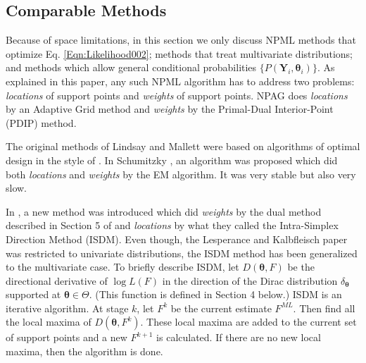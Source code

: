 

\subsection{Comparable Methods}

Because of space limitations, in this section we only discuss NPML methods that optimize Eq. \ref{Eqn:Likelihood002}; methods that treat multivariate distributions; and methods which allow general conditional probabilities 
$\{P(\bm{Y}_i, \bm{\theta}_i)\}$.
%
As explained in this paper, any such NPML algorithm has to address two problems: {\em locations} of support points and {\em weights} of support points.
%
NPAG does {\em locations} by an Adaptive Grid method and {\em weights} by the Primal-Dual Interior-Point (PDIP) method.
%

The original methods of Lindsay \cite{Lindsay1983}  and Mallett  
\cite{Mallet1986} 
were based on algorithms of optimal design in the style of \citet{Fedorov1972}. %
In Schumitzky
\cite{Schumitzky1991},
an algorithm  was proposed which did both {\em locations} and {\em weights} by the EM algorithm.  It was very stable but also very slow. 

In  \citet{Lesperance1992},  a new method was introduced  %
which did  {\em weights}  by the dual method described in Section 5 of  \citet{Lindsay1983} 
and {\em locations} by what they called the Intra-Simplex Direction Method (ISDM). Even though, the Lesperance and Kalbfleisch paper was restricted to univariate distributions, the ISDM method has been generalized to the multivariate case. To briefly describe ISDM, let  $D(\bm{\theta},F)$ be the directional derivative of   $\log L(F)$ in the direction of the Dirac distribution $\delta_{\bm{\theta}}$ supported at $\bm{\theta}  \in \Theta$.  (This function is defined in Section 4 below.)  ISDM is an iterative algorithm. At stage $k$, let $F^k$ be the current estimate $F^{ML}$. Then find all the local maxima  of $D(\bm{\theta}, F^k)$.  These local maxima are added to the current set of support points and a new $F^{k+1}$
is calculated. If there are no new local maxima, then the algorithm is done.

